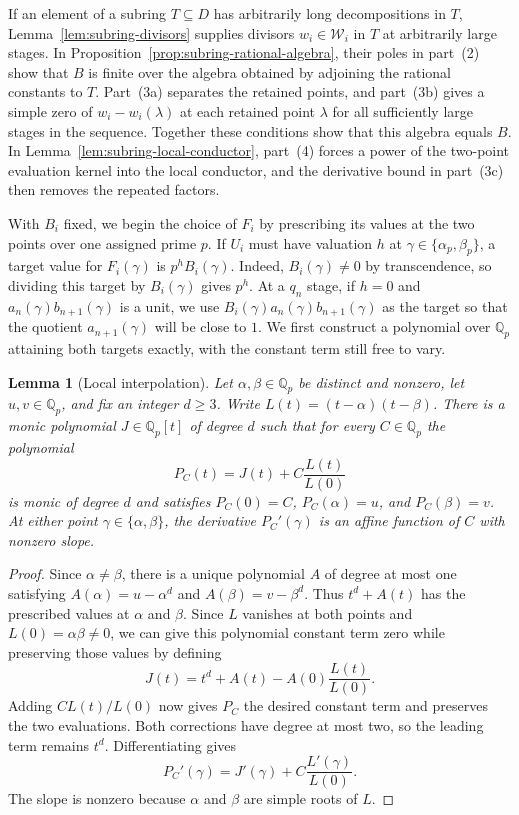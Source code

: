\documentclass{article}
\newtheorem{lemma}[proposition]{Lemma}
\theoremstyle{remark}
\begin{document}
If an element of a subring $T \subseteq D$ has arbitrarily long decompositions in $T$, Lemma~\ref{lem:subring-divisors} supplies divisors $w_i \in \mathcal{W}_i$ in $T$ at arbitrarily large stages.
In Proposition~\ref{prop:subring-rational-algebra}, their poles in part~(2) show that $B$ is finite over the algebra obtained by adjoining the rational constants to $T$.
Part~(3a) separates the retained points, and part~(3b) gives a simple zero of $w_i - w_i(\lambda)$ at each retained point $\lambda$ for all sufficiently large stages in the sequence.
Together these conditions show that this algebra equals $B$.
In Lemma~\ref{lem:subring-local-conductor}, part~(4) forces a power of the two-point evaluation kernel into the local conductor, and the derivative bound in part~(3c) then removes the repeated factors.

With $B_i$ fixed, we begin the choice of $F_i$ by prescribing its values at the two points over one assigned prime $p$.
If $U_i$ must have valuation $h$ at $\gamma \in \{\alpha_p, \beta_p\}$, a target value for $F_i(\gamma)$ is $p^h B_i(\gamma)$.
Indeed, $B_i(\gamma) \ne 0$ by transcendence, so dividing this target by $B_i(\gamma)$ gives $p^h$.
At a $q_n$ stage, if $h = 0$ and $a_n(\gamma)b_{n + 1}(\gamma)$ is a unit, we use $B_i(\gamma)a_n(\gamma)b_{n + 1}(\gamma)$ as the target so that the quotient $a_{n + 1}(\gamma)$ will be close to $1$.
We first construct a polynomial over $\mathbb{Q}_p$ attaining both targets exactly, with the constant term still free to vary.

\begin{lemma}[Local interpolation]
    \label{lem:local-interpolation}
    Let $\alpha, \beta \in \mathbb{Q}_p$ be distinct and nonzero, let $u, v \in \mathbb{Q}_p$, and fix an integer $d \ge 3$.
    Write $L(t) = (t - \alpha)(t - \beta)$.
    There is a monic polynomial $J \in \mathbb{Q}_p[t]$ of degree $d$ such that for every $C \in \mathbb{Q}_p$ the polynomial
    \[
        P_C(t) = J(t) + C \frac{L(t)}{L(0)}
    \]
    is monic of degree $d$ and satisfies $P_C(0) = C$, $P_C(\alpha) = u$, and $P_C(\beta) = v$.
    At either point $\gamma \in \{\alpha, \beta\}$, the derivative $P_C'(\gamma)$ is an affine function of $C$ with nonzero slope.
\end{lemma}

\begin{proof}
    Since $\alpha \ne \beta$, there is a unique polynomial $A$ of degree at most one satisfying $A(\alpha) = u - \alpha^d$ and $A(\beta) = v - \beta^d$.
    Thus $t^d + A(t)$ has the prescribed values at $\alpha$ and $\beta$.
    Since $L$ vanishes at both points and $L(0) = \alpha\beta \ne 0$, we can give this polynomial constant term zero while preserving those values by defining
    \[
        J(t) = t^d + A(t) - A(0)\frac{L(t)}{L(0)}.
    \]
    Adding $C L(t)/L(0)$ now gives $P_C$ the desired constant term and preserves the two evaluations.
    Both corrections have degree at most two, so the leading term remains $t^d$.
    Differentiating gives
    \[
        P_C'(\gamma) = J'(\gamma) + C \frac{L'(\gamma)}{L(0)}.
    \]
    The slope is nonzero because $\alpha$ and $\beta$ are simple roots of $L$.
\end{proof}
\end{document}
